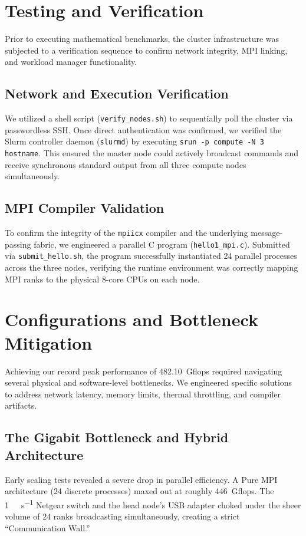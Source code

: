 \documentclass[11pt]{article}
\begin{document}
\section{Testing and Verification}
Prior to executing mathematical benchmarks, the cluster infrastructure was subjected to a verification sequence to confirm network integrity, MPI linking, and workload manager functionality.

\subsection{Network and Execution Verification}
We utilized a shell script (\texttt{verify\_nodes.sh}) to sequentially poll the cluster via passwordless SSH. Once direct authentication was confirmed, we verified the Slurm controller daemon (\texttt{slurmd}) by executing \texttt{srun -p compute -N 3 hostname}. This ensured the master node could actively broadcast commands and receive synchronous standard output from all three compute nodes simultaneously.

\subsection{MPI Compiler Validation}
To confirm the integrity of the \texttt{mpiicx} compiler and the underlying message-passing fabric, we engineered a parallel C program (\texttt{hello1\_mpi.c}). Submitted via \texttt{submit\_hello.sh}, the program successfully instantiated 24 parallel processes across the three nodes, verifying the runtime environment was correctly mapping MPI ranks to the physical 8-core CPUs on each node.

\section{Configurations and Bottleneck Mitigation}
Achieving our record peak performance of \SI{482.10}{Gflops} required navigating several physical and software-level bottlenecks. We engineered specific solutions to address network latency, memory limits, thermal throttling, and compiler artifacts.

\subsection{The Gigabit Bottleneck and Hybrid Architecture}
Early scaling tests revealed a severe drop in parallel efficiency. A Pure MPI architecture (24 discrete processes) maxed out at roughly \SI{446}{Gflops}. The \SI{1}{\giga\bit\per\second} Netgear switch and the head node's USB adapter choked under the sheer volume of 24 ranks broadcasting simultaneously, creating a strict ``Communication Wall.''
\end{document}
